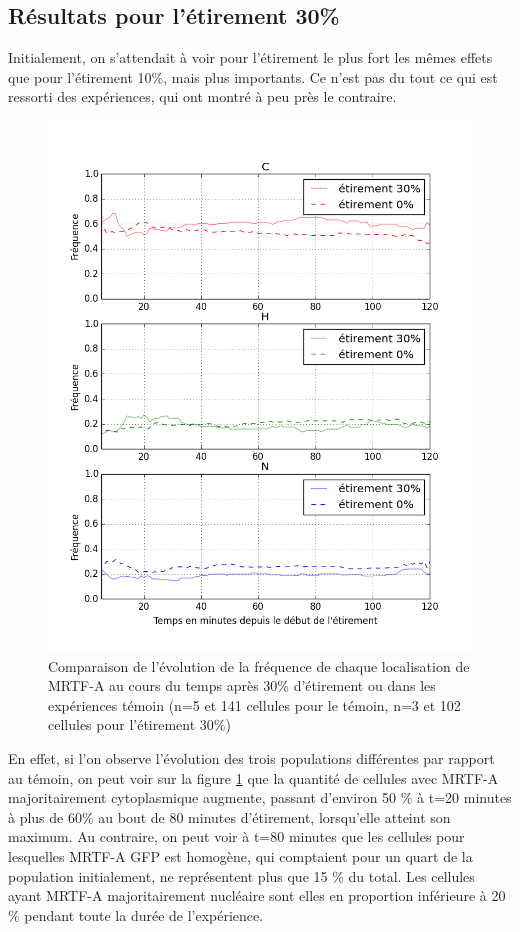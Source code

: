 \subsection{Résultats pour l'étirement 30\%}

Initialement, on s'attendait à voir pour l'étirement le plus fort les mêmes effets que pour l'étirement 10\%, mais plus importants. 
Ce n'est pas du tout ce qui est ressorti des expériences, qui ont montré à peu près le contraire. 

\begin{figure}
\includegraphics[scale=0.5]{Figures/Etirement30_vs_0_dynamique.png} 
\caption{\label{Et30_CHN} Comparaison de l'évolution de la fréquence de chaque localisation de MRTF-A au cours du temps après 30\% d'étirement ou dans les expériences témoin (n=5 et 141 cellules pour le témoin, n=3 et 102 cellules pour l'étirement 30\%)}
\end{figure}
En effet, si l'on observe l'évolution des trois populations différentes par rapport au témoin, on peut voir sur la figure \ref{Et30_CHN} que la quantité de cellules avec MRTF-A majoritairement cytoplasmique augmente, passant d'environ 50 \% à t=20 minutes à plus de 60\% au bout de 80 minutes d'étirement, lorsqu'elle atteint son maximum. 
Au contraire, on peut voir à t=80 minutes que les cellules pour lesquelles MRTF-A GFP est homogène, qui comptaient pour un quart de la population initialement, ne représentent plus que 15 \% du total. 
Les cellules ayant MRTF-A majoritairement nucléaire sont elles en proportion inférieure à 20 \% pendant toute la durée de l'expérience.

